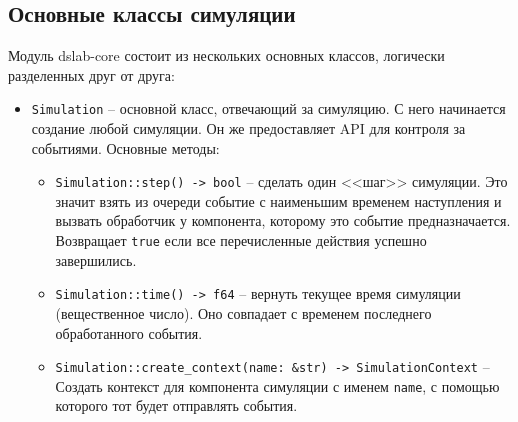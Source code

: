 \subsection{Основные классы симуляции}
Модуль dslab-core состоит из нескольких основных классов, логически разделенных друг от друга:
\begin{itemize}
    \item \texttt{Simulation} \label{Simulation} -- основной класс, отвечающий за симуляцию. С него начинается создание любой симуляции. Он же предоставляет API для контроля за событиями. Основные методы:
    \begin{itemize}
        \item \label{Simulation::step} \texttt{Simulation::step() -> bool} -- сделать один <<шаг>> симуляции. Это значит взять из очереди событие с наименьшим временем наступления и вызвать обработчик у компонента, которому это событие предназначается. Возвращает \texttt{true} если все перечисленные действия успешно завершились. 
        \item \texttt{Simulation::time() -> f64} -- вернуть текущее время симуляции (вещественное число). Оно совпадает с временем последнего обработанного события. 
        \item \label{Simulation::createcontext} \texttt{Simulation::create\_context(name: \&str) -> SimulationContext} -- Создать контекст для компонента симуляции с именем \texttt{name}, с помощью которого тот будет отправлять события.
    

\end{itemize}
\end{itemize}

